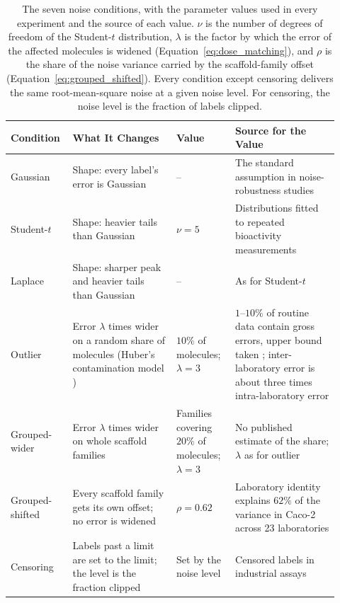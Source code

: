 \begin{table}[htbp]
\centering
\small
\begin{adjustbox}{max width=\textwidth}
\begin{tabular}{@{}P{0.15\linewidth}P{0.30\linewidth}P{0.17\linewidth}P{0.30\linewidth}@{}}
\toprule
\textbf{Condition} & \textbf{What It Changes} & \textbf{Value} & \textbf{Source for the Value} \\
\midrule
Gaussian & Shape: every label's error is Gaussian & -- & The standard assumption in noise-robustness studies \\
Student-$t$ & Shape: heavier tails than Gaussian & $\nu = 5$ & Distributions fitted to repeated bioactivity measurements \citep{Kruger2012} \\
Laplace & Shape: sharper peak and heavier tails than Gaussian & -- & As for Student-$t$ \citep{Kruger2012} \\
Outlier & Error $\lambda$ times wider on a random share of molecules (Huber's contamination model \citep{huber1964robust}) & $10\%$ of molecules; $\lambda = 3$ & $1$--$10\%$ of routine data contain gross errors, upper bound taken \citep{Hampel2001}; inter-laboratory error is about three times intra-laboratory error \citep{Avdeef2019} \\
Grouped-wider & Error $\lambda$ times wider on whole scaffold families & Families covering $20\%$ of molecules; $\lambda = 3$ & No published estimate of the share; $\lambda$ as for outlier \citep{Avdeef2019} \\
Grouped-shifted & Every scaffold family gets its own offset; no error is widened & $\rho = 0.62$ & Laboratory identity explains $62\%$ of the variance in Caco-2 across 23 laboratories \citep{Bentz2013} \\
Censoring & Labels past a limit are set to the limit; the level is the fraction clipped & Set by the noise level & Censored labels in industrial assays \citep{Svensson2025} \\
\bottomrule
\end{tabular}
\end{adjustbox}
\caption[The seven noise conditions and their parameters.]{The seven noise conditions, with the parameter values used in every experiment and the source of each value. $\nu$ is the number of degrees of freedom of the Student-$t$ distribution, $\lambda$ is the factor by which the error of the affected molecules is widened (Equation~\ref{eq:dose_matching}), and $\rho$ is the share of the noise variance carried by the scaffold-family offset (Equation~\ref{eq:grouped_shifted}). Every condition except censoring delivers the same root-mean-square noise at a given noise level. For censoring, the noise level is the fraction of labels clipped.}
\label{tab:noise_conditions}
\end{table}

